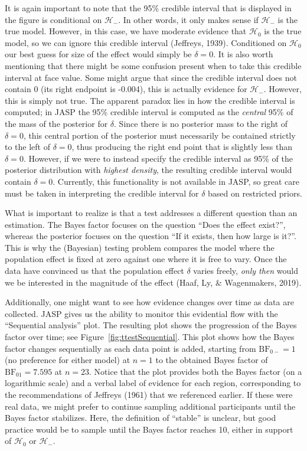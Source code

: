 \documentclass[english,,doc,floatsintext]{apa6}
\begin{document}
It is again important to note that the 95\% credible interval that is displayed in the figure is conditional on \(\mathcal{H}_{-}\). In other words, it only makes sense if \(\mathcal{H}_{-}\) is the true model. However, in this case, we have moderate evidence that \(\mathcal{H}_{0}\) is the true model, so we can ignore this credible interval (Jeffreys, 1939). Conditioned on \(\mathcal{H}_{0}\) our best guess for size of the effect would simply be \(\delta = 0\). It is also worth mentioning that there might be some confusion present when to take this credible interval at face value. Some might argue that since the credible interval does not contain 0 (its right endpoint is -0.004), this is actually evidence for \(\mathcal{H}_{-}\). However, this is simply not true. The apparent paradox lies in how the credible interval is computed; in JASP the 95\% credible interval is computed as the \emph{central} 95\% of the mass of the posterior for \(\delta\). Since there is no posterior mass to the right of \(\delta=0\), this central portion of the posterior must necessarily be contained strictly to the left of \(\delta=0\), thus producing the right end point that is slightly less than \(\delta=0\). However, if we were to instead specify the credible interval as 95\% of the posterior distribution with \emph{highest density}, the resulting credible interval would contain \(\delta=0\). Currently, this functionality is not available in JASP, so great care must be taken in interpreting the credible interval for \(\delta\) based on restricted priors.

What is important to realize is that a test addresses a different question than an estimation. The Bayes factor focuses on the question \enquote{Does the effect exist?}, whereas the posterior focuses on the question \enquote{If it exists, then how large is it?}. This is why the (Bayesian) testing problem compares the model where the population effect is fixed at zero against one where it is free to vary. Once the data have convinced us that the population effect \(\delta\) varies freely, \emph{only then} would we be interested in the magnitude of the effect (Haaf, Ly, \& Wagenmakers, 2019).

Additionally, one might want to see how evidence changes over time as data are collected. JASP gives us the ability to monitor this evidential flow with the \enquote{Sequential analysis} plot. The resulting plot shows the progression of the Bayes factor over time; see Figure~\ref{fig:ttestSequential}. This plot shows how the Bayes factor changes sequentially as each data point is added, starting from \(\text{BF}_{0-}=1\) (no preference for either model) at \(n=1\) to the obtained Bayes factor of \(\text{BF}_{01}=7.595\) at \(n=23\). Notice that the plot provides both the Bayes factor (on a logarithmic scale) and a verbal label of evidence for each region, corresponding to the recommendations of Jeffreys (1961) that we referenced earlier. If these were real data, we might prefer to continue sampling additional participants until the Bayes factor stabilizes. Here, the definition of \enquote{stable} is unclear, but good practice would be to sample until the Bayes factor reaches 10, either in support of \(\mathcal{H}_{0}\) or \(\mathcal{H}_{-}\).
\end{document}
